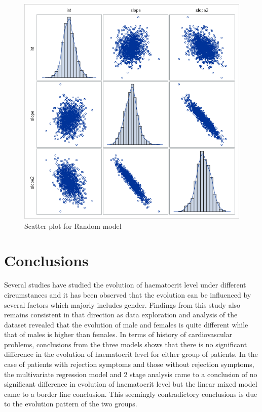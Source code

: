 \documentclass[11pt]{article}
\begin{document}
\begin{figure}[H]
\begin{minipage}{.4\textwidth}
		\includegraphics[scale=0.38]{SGScatterRandom-effect.png}
		\caption{Scatter plot for Random model}
	\end{minipage}
\end{figure}

\section{Conclusions}
Several studies have studied the evolution of haematocrit level under different circumstances and it has been observed that the evolution can be influenced by several factors which majorly includes gender. Findings from this study also remains consistent in that direction as data exploration and analysis of the dataset revealed that the evolution of male and females is quite different while that of males is higher than females. In terms of history of cardiovascular problems, conclusions from the three models shows that there is no significant difference in the evolution of haematocrit level for either group of patients. In the case of patients with rejection symptoms and those without rejection symptoms, the multivariate regression model and 2 stage analysis came to a conclusion of no significant difference in evolution of haematocrit level but the linear mixed model came to a border line conclusion. This seemingly contradictory conclusions is due to the evolution pattern of the two groups.
\end{document}
